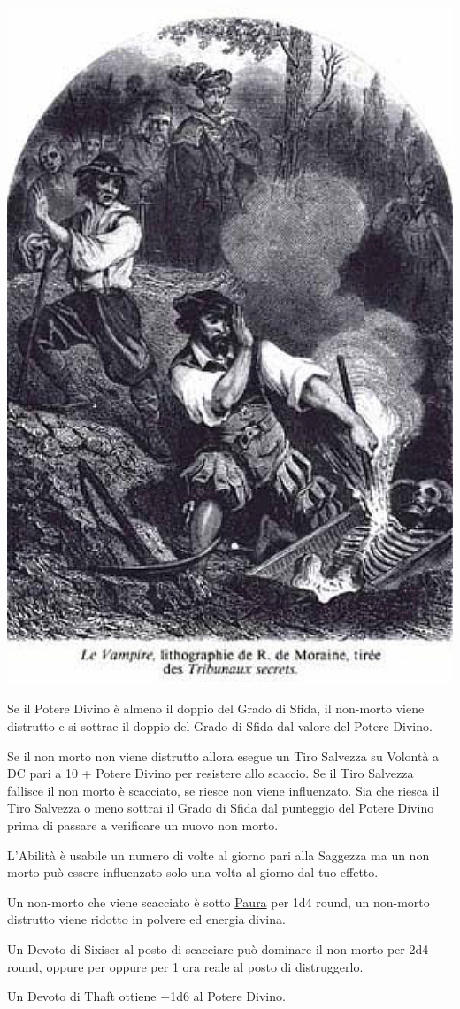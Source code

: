 \begin{multicols}{2}
\begin{center}
	\includegraphics[width=0.6\linewidth]{immagini/turning-undead-six.png}
\end{center}

\medskip

Se il Potere Divino è almeno il doppio del Grado di Sfida, il non-morto viene distrutto e si sottrae il doppio del Grado di Sfida dal valore del Potere Divino.

Se il non morto non viene distrutto allora esegue un Tiro Salvezza su Volontà a DC pari a 10 + Potere Divino per resistere allo scaccio. Se il Tiro Salvezza fallisce il non morto è scacciato, se riesce non viene influenzato. Sia che riesca il Tiro Salvezza o meno sottrai il Grado di Sfida dal punteggio del Potere Divino prima di passare a verificare un nuovo non morto.

L'Abilità è usabile un numero di volte al giorno pari alla Saggezza ma un non morto può essere influenzato solo una volta al giorno dal tuo effetto.

Un non-morto che viene scacciato è sotto \hyperlink{condizionepaura}{Paura} per 1d4 round, un non-morto distrutto viene ridotto in polvere ed energia divina.

Un Devoto di Sixiser al posto di scacciare può dominare il non morto per 2d4 round, oppure per oppure per 1 ora reale al posto di distruggerlo.

Un Devoto di Thaft ottiene +1d6 al Potere Divino.



\end{multicols}
